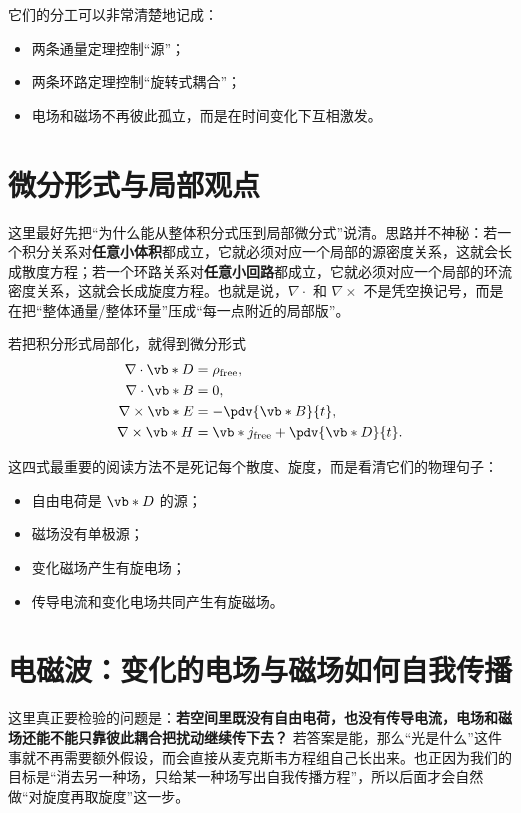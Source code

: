 \documentclass[lang=cn,11pt]{elegantbook}
\begin{document}
它们的分工可以非常清楚地记成：
\begin{itemize}
 \item 两条通量定理控制“源”；
 \item 两条环路定理控制“旋转式耦合”；
 \item 电场和磁场不再彼此孤立，而是在时间变化下互相激发。
\end{itemize}

\section{微分形式与局部观点}

这里最好先把“为什么能从整体积分式压到局部微分式”说清。思路并不神秘：若一个积分关系对\textbf{任意小体积}都成立，它就必须对应一个局部的源密度关系，这就会长成散度方程；若一个环路关系对\textbf{任意小回路}都成立，它就必须对应一个局部的环流密度关系，这就会长成旋度方程。也就是说，\(\nabla\cdot\) 和 \(\nabla\times\) 不是凭空换记号，而是在把“整体通量/整体环量”压成“每一点附近的局部版”。

若把积分形式局部化，就得到微分形式
\begin{align*}
\nabla\cdot \vb*{D}&=\rho_{\mathrm{free}},\\
\nabla\cdot \vb*{B}&=0,\\
\nabla\times \vb*{E}&=-\pdv{\vb*{B}}{t},\\
\nabla\times \vb*{H}&=\vb*{j}_{\mathrm{free}}+\pdv{\vb*{D}}{t}.
\end{align*}

这四式最重要的阅读方法不是死记每个散度、旋度，而是看清它们的物理句子：
\begin{itemize}
 \item 自由电荷是 \(\vb*{D}\) 的源；
 \item 磁场没有单极源；
 \item 变化磁场产生有旋电场；
 \item 传导电流和变化电场共同产生有旋磁场。
\end{itemize}

\section{电磁波：变化的电场与磁场如何自我传播}

这里真正要检验的问题是：\textbf{若空间里既没有自由电荷，也没有传导电流，电场和磁场还能不能只靠彼此耦合把扰动继续传下去？} 若答案是能，那么“光是什么”这件事就不再需要额外假设，而会直接从麦克斯韦方程组自己长出来。也正因为我们的目标是“消去另一种场，只给某一种场写出自我传播方程”，所以后面才会自然做“对旋度再取旋度”这一步。
\end{document}
